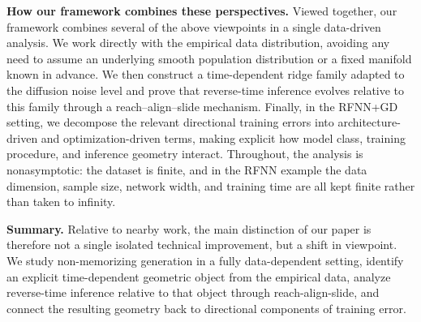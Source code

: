 \documentclass[11pt]{article}
\begin{document}
\noindent\textbf{How our framework combines these perspectives.}
Viewed together, our framework combines several of the above viewpoints in a single data-driven analysis. We work directly with the empirical data distribution, avoiding any need to assume an underlying smooth population distribution or a fixed manifold known in advance. We then construct a time-dependent ridge family adapted to the diffusion noise level and prove that reverse-time inference evolves relative to this family through a reach--align--slide mechanism. Finally, in the RFNN+GD setting, we decompose the relevant directional training errors into architecture-driven and optimization-driven terms, making explicit how model class, training procedure, and inference geometry interact. Throughout, the analysis is nonasymptotic: the dataset is finite, and in the RFNN example the data dimension, sample size, network width, and training time are all kept finite rather than taken to infinity.

\noindent\textbf{Summary.}
Relative to nearby work, the main distinction of our paper is therefore not a single isolated technical improvement, but a shift in viewpoint. We study non-memorizing generation in a fully data-dependent setting, identify an explicit time-dependent geometric object from the empirical data, analyze reverse-time inference relative to that object through reach-align-slide, and connect the resulting geometry back to directional components of training error.
\end{document}
